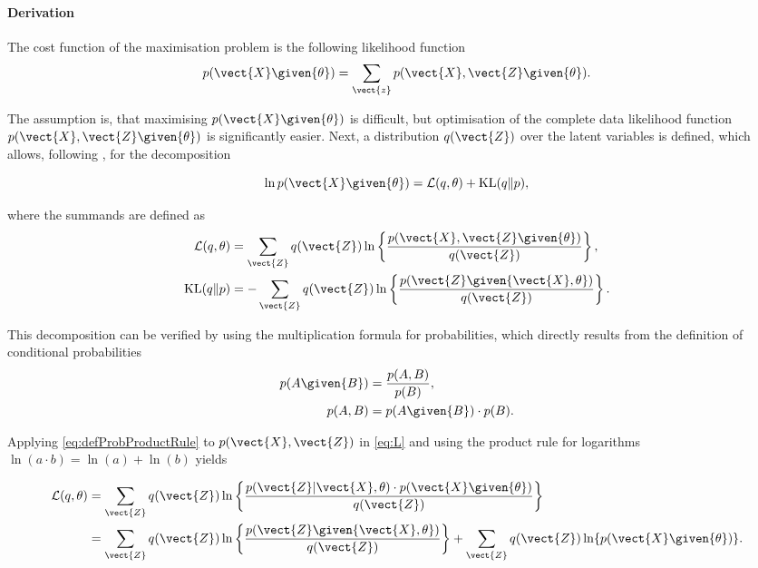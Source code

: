 \paragraph{Derivation}
The cost function of the maximisation problem is the following likelihood function
\begin{equation}
    p(\vect{X}\given{\theta})=\sum_\vect{z} p(\vect{X},\vect{Z}\given{\theta}).
\end{equation}

The assumption is, that maximising $p(\vect{X}\given{\theta})$ is difficult, but optimisation of the complete data likelihood function $p(\vect{X},\vect{Z}\given{\theta})$ is significantly easier. Next, a distribution $q(\vect{Z})$ over the latent variables is defined, which allows, following \cite[p.450]{Bishop2006}, for the decomposition

\begin{equation}\label{eq:decomposition}
    \ln p(\vect{X}\given{\theta})=\mathcal{L}(q,\theta)+\text{KL}(q\|p),
\end{equation}

where the summands are defined as
\begin{align}
    \mathcal{L}(q,\theta)&=\sum_\vect{Z}q(\vect{Z})\ln\left\{\frac{p(\vect{X},\vect{Z}\given{\theta})}{q(\vect{Z})}\right\}\label{eq:L},\\
    \text{KL}(q\|p)&=-\sum_{\vect{Z}}q(\vect{Z})\ln\left\{\frac{p(\vect{Z}\given{\vect{X},\theta})}{q(\vect{Z})} \right\}\label{eq:KL}.
\end{align}

This decomposition can be verified by using the multiplication formula for probabilities, which directly results from the definition of conditional probabilities
\begin{align}
\label{eq:defProbCond}
    p(A\given{B})&=\frac{p(A,B)}{p(B)},\\
\label{eq:defProbProductRule}
    p(A,B)&=p(A\given{B})\cdot p(B).
\end{align}

Applying \eqref{eq:defProbProductRule} to $p(\vect{X},\vect{Z})$ in \eqref{eq:L} and using the product rule for logarithms $\ln(a\cdot b)=\ln(a)+\ln(b)$ yields

\begin{align}
    \mathcal{L}(q,\theta)&=\sum_{\vect{Z}}q(\vect{Z})\ln\left\{\frac{p(\vect{Z}\vert\vect{X},\theta)\cdot p(\vect{X}\given{\theta})}{q(\vect{Z})}\right\}\\
\label{eq:Lexpanded}
    &=\sum_{\vect{Z}}q(\vect{Z})\ln\left\{\frac{p(\vect{Z}\given{\vect{X},\theta})}{q(\vect{Z})} \right\}+\sum_{\vect{Z}}q(\vect{Z})\ln\{p(\vect{X}\given{\theta})\}.
\end{align}

